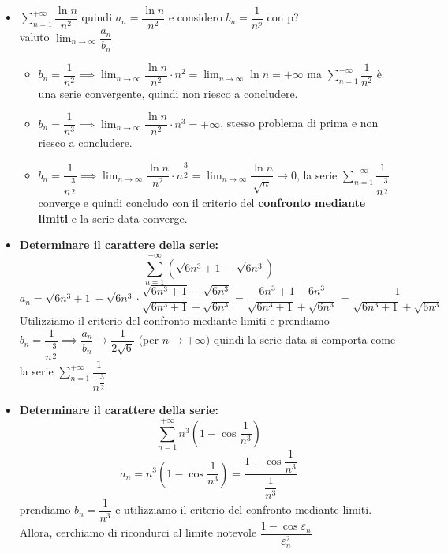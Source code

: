 \documentclass[../main.tex]{subfiles}
\begin{document}
\begin{itemize}
    \item $\sum_{n=1}^{+\infty} \dfrac{\ln n}{n^2} $
          quindi $a_n = \dfrac{\ln n}{n^2}$ e considero $b_n = \dfrac{1}{n^p}$ con p?\\
          valuto $\lim_{n\to\infty}\dfrac{a_n}{b_n}$
          \begin{itemize}
              \item $b_n = \dfrac{1}{n^2} \implies \lim_{n\to\infty} \dfrac{\ln{n}}{n^2} \cdot n^2 = \lim_{n\to\infty}\ln n = +\infty$ ma $\sum_{n=1}^{+\infty}\dfrac{1}{n^2}$ è una serie convergente, quindi non riesco a concludere.
              \item $b_n = \dfrac{1}{n^3} \implies \lim_{n\to\infty} \dfrac{\ln n}{n^2} \cdot n^3 = +\infty$, stesso problema di prima e non riesco a concludere.
              \item $b_n = \dfrac{1}{n^{\dfrac{3}{2}}} \implies \lim_{n\to\infty} \dfrac{\ln n}{n^2} \cdot n^{\dfrac{3}{2}} = \lim_{n\to\infty} \dfrac{\ln n}{\sqrt{n}} \to 0$, la serie $\sum_{n=1}^{+\infty}\dfrac{1}{n^{\dfrac{3}{2}}}$ converge e quindi concludo con il criterio del \textbf{confronto mediante limiti} e la serie data converge.
          \end{itemize}
    \item \textbf{Determinare il carattere della serie:}
          \[
              \sum_{n=1}^{+\infty}(\sqrt{6n^3+1} - \sqrt{6n^3})
          \]
          \[
              a_n = \sqrt{6n^3+1} - \sqrt{6n^3} \cdot \dfrac{\sqrt{6n^3+1} + \sqrt{6n^3}}{\sqrt{6n^3+1} + \sqrt{6n^3}} = \dfrac{6n^3+1-6n^3}{\sqrt{6n^3+1} + \sqrt{6n^3}} = \dfrac{1}{\sqrt{6n^3+1} + \sqrt{6n^3}}
          \]
          Utilizziamo il criterio del confronto mediante limiti e prendiamo $b_n =
              \dfrac{1}{n^{\dfrac{3}{2}}} \implies \dfrac{a_n}{b_n} \rightarrow
              \dfrac{1}{2\sqrt{6}}$ (per $n\to+\infty$) quindi la serie data si comporta come
          la serie $\sum_{n=1}^{+\infty} \dfrac{1}{n^{\dfrac{3}{2}}}$
    \item \textbf{Determinare il carattere della serie:}
          \[
              \sum_{n=1}^{+\infty} n^3(1-\cos\dfrac{1}{n^3})
          \]
          \[
              a_n = n^3(1-\cos\dfrac{1}{n^3}) = \dfrac{1-\cos{\dfrac{1}{n^3}}}{\dfrac{1}{n^3}}
          \]
          prendiamo $b_n = \dfrac{1}{n^3}$ e utilizziamo il criterio del confronto
          mediante limiti. Allora, cerchiamo di ricondurci al limite notevole
          $\dfrac{1-\cos{\varepsilon_n}}{\varepsilon_n^2}$
          \[
\]
\end{itemize}
\end{document}
